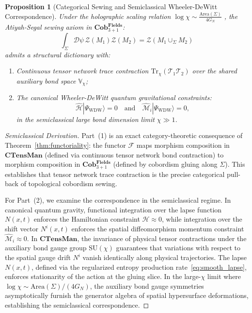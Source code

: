 \documentclass[11pt,a4paper,reqno]{amsart}
\newtheorem{proposition}[theorem]{Proposition}
\theoremstyle{definition}
\numberwithin{equation}{section}
\newcommand{\CTens}{\mathbf{CTensMan}}
\newcommand{\Cob}{\mathbf{Cob}_{3+1}^{\mathbf{Fields}}}
\newcommand{\Tr}{\mathrm{Tr}}
\newcommand{\Area}{\mathrm{Area}}
\begin{document}
\begin{proposition}[Categorical Sewing and Semiclassical Wheeler-DeWitt Correspondence] \label{prop:sewing}
Under the holographic scaling relation $\log \chi \sim \frac{\Area(\Sigma)}{4 G_N}$ \cite{ryu2006holographic}, the Atiyah-Segal sewing axiom in $\Cob$:
\begin{equation}
    \int_{\Sigma} \mathcal{D}\psi \, \mathcal{Z}(M_1) \mathcal{Z}(M_2) = \mathcal{Z}(M_1 \cup_\Sigma M_2) \label{eq:sewing_axiom}
\end{equation}
admits a structural dictionary with:
\begin{enumerate}
    \item Continuous tensor network trace contraction $\Tr_{\chi}(\mathcal{T}_1 \mathcal{T}_2)$ over the shared auxiliary bond space $\mathbb{V}_\chi$;
    \item The canonical Wheeler-DeWitt quantum gravitational constraints:
    \begin{equation}
        \hat{\mathcal{H}} |\Psi_{\mathrm{WDW}}\rangle = 0 \quad \text{and} \quad \hat{\mathcal{M}}_i |\Psi_{\mathrm{WDW}}\rangle = 0,
    \end{equation}
    in the semiclassical large bond dimension limit $\chi \gg 1$.
\end{enumerate}
\end{proposition}

\begin{proof}[Semiclassical Derivation]
Part~(1) is an exact category-theoretic consequence of Theorem~\ref{thm:functoriality}: the functor $\mathcal{F}$ maps morphism composition in $\CTens$ (defined via continuous tensor network bond contraction) to morphism composition in $\Cob$ (defined by cobordism gluing along $\Sigma$). This establishes that tensor network trace contraction is the precise categorical pull-back of topological cobordism sewing.

For Part~(2), we examine the correspondence in the semiclassical regime. In canonical quantum gravity, functional integration over the lapse function $N(x, t)$ enforces the Hamiltonian constraint $\hat{\mathcal{H}} \approx 0$, while integration over the shift vector $N^i(x, t)$ enforces the spatial diffeomorphism momentum constraint $\hat{\mathcal{M}}_i \approx 0$. In $\CTens$, the invariance of physical tensor contractions under the auxiliary bond gauge group $\mathrm{SU}(\chi)$ guarantees that variations with respect to the spatial gauge drift $N^i$ vanish identically along physical trajectories. The lapse $N(x, t)$, defined via the regularized entropy production rate~\eqref{eq:smooth_lapse}, enforces stationarity of the action at the gluing slice. In the large-$\chi$ limit where $\log \chi \sim \Area(\Sigma)/(4G_N)$, the auxiliary bond gauge symmetries asymptotically furnish the generator algebra of spatial hypersurface deformations, establishing the semiclassical correspondence.
\end{proof}
\end{document}
